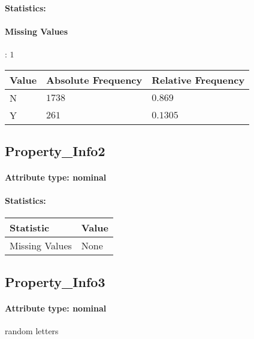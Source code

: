 \paragraph{Statistics: }
\paragraph{Missing Values}: $1$
\begin{table}[H]
	\renewcommand{\arraystretch}{1.25}
	\begin{tabular}{l|l|l}
		\textbf{Value} & \textbf{Absolute Frequency} & \textbf{Relative Frequency}\\\hline
		N&$1738$&$0.869$\\\hline
		Y&$261$&$0.1305$
\end{tabular}
\end{table}

\subsection{Property\_Info2}
\paragraph{Attribute type: nominal}
\paragraph{Statistics: }
\begin{table}[H]
	\renewcommand{\arraystretch}{1.25}
	\begin{tabular}{l|l}
		\textbf{Statistic} & \textbf{Value}\\\hline
		Missing Values& None\\\hline
	\end{tabular}
\end{table}

\subsection{Property\_Info3}
\paragraph{Attribute type: nominal} random letters
